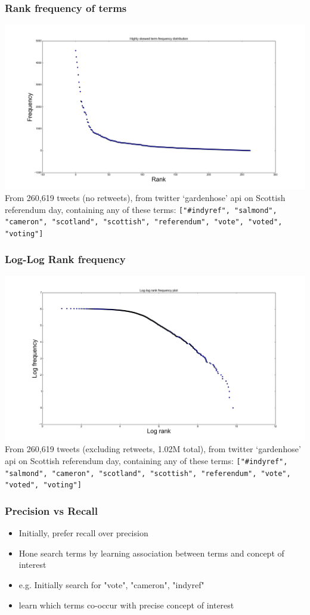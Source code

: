 \documentclass[11pt, table, dvipsnames]{beamer}
\begin{document}
\begin{frame}
  \frametitle{Rank frequency of terms}
    \includegraphics[scale=0.20]{zipf1}\\
  \scriptsize
From 260,619 tweets (no retweets), from twitter `gardenhose' api on Scottish referendum day, containing any of these terms: \texttt{["\#indyref", "salmond", "cameron", "scotland", "scottish", "referendum", "vote", "voted", "voting"]}
\end{frame}

\begin{frame}
  \frametitle{Log-Log Rank frequency}

    \includegraphics[scale=0.20]{zipf2}\\
  \scriptsize
From 260,619 tweets (excluding retweets, 1.02M total), from twitter `gardenhose' api on Scottish referendum day, containing any of these terms: \texttt{["\#indyref", "salmond", "cameron", "scotland", "scottish", "referendum", "vote", "voted", "voting"]}
\end{frame}



\begin{frame}
  \frametitle{Precision vs Recall}
  \begin{itemize}
  \item Initially, prefer recall over precision
  \item Hone search terms by learning association between terms and concept of interest
  \item e.g. Initially search for "vote", "cameron", "indyref"
  \item learn which terms co-occur with precise concept of interest
  \end{itemize}
\end{frame}
\end{document}
